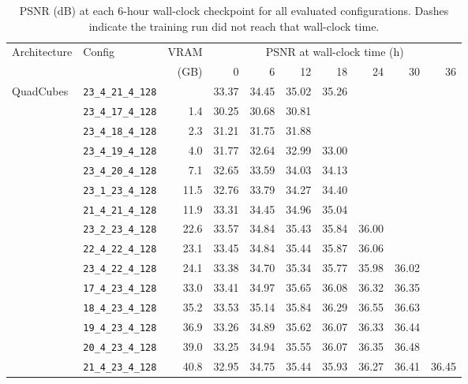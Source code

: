 \documentclass[12pt, a4paper, twoside]{report}
\begin{document}
\begin{table}[htbp]
\caption{PSNR (dB) at each 6-hour wall-clock checkpoint for all evaluated configurations. Dashes indicate the training run did not reach that wall-clock time.}
\label{tab:app_time}
\begin{adjustwidth}{-3cm}{-1cm}
\centering
\footnotesize
\setlength{\tabcolsep}{4pt}
\begin{tabular}{llrrrrrrrr}
\toprule
Architecture & Config & VRAM & \multicolumn{7}{c}{PSNR at wall-clock time (h)} \\
\cmidrule(lr){4-10}
 & & (GB) & 0 & 6 & 12 & 18 & 24 & 30 & 36 \\
\midrule
  QuadCubes & \texttt{23\_4\_21\_4\_128} &   & 33.37 & 34.45 & 35.02 & 35.26 &   &   &   \\
   & \texttt{23\_4\_17\_4\_128} & 1.4 & 30.25 & 30.68 & 30.81 &   &   &   &   \\
   & \texttt{23\_4\_18\_4\_128} & 2.3 & 31.21 & 31.75 & 31.88 &   &   &   &   \\
   & \texttt{23\_4\_19\_4\_128} & 4.0 & 31.77 & 32.64 & 32.99 & 33.00 &   &   &   \\
   & \texttt{23\_4\_20\_4\_128} & 7.1 & 32.65 & 33.59 & 34.03 & 34.13 &   &   &   \\
   & \texttt{23\_1\_23\_4\_128} & 11.5 & 32.76 & 33.79 & 34.27 & 34.40 &   &   &   \\
   & \texttt{21\_4\_21\_4\_128} & 11.9 & 33.31 & 34.45 & 34.96 & 35.04 &   &   &   \\
   & \texttt{23\_2\_23\_4\_128} & 22.6 & 33.57 & 34.84 & 35.43 & 35.84 & 36.00 &   &   \\
   & \texttt{22\_4\_22\_4\_128} & 23.1 & 33.45 & 34.84 & 35.44 & 35.87 & 36.06 &   &   \\
   & \texttt{23\_4\_22\_4\_128} & 24.1 & 33.38 & 34.70 & 35.34 & 35.77 & 35.98 & 36.02 &   \\
   & \texttt{17\_4\_23\_4\_128} & 33.0 & 33.41 & 34.97 & 35.65 & 36.08 & 36.32 & 36.35 &   \\
   & \texttt{18\_4\_23\_4\_128} & 35.2 & 33.53 & 35.14 & 35.84 & 36.29 & 36.55 & 36.63 &   \\
   & \texttt{19\_4\_23\_4\_128} & 36.9 & 33.26 & 34.89 & 35.62 & 36.07 & 36.33 & 36.44 &   \\
   & \texttt{20\_4\_23\_4\_128} & 39.0 & 33.25 & 34.94 & 35.55 & 36.07 & 36.35 & 36.48 &   \\
   & \texttt{21\_4\_23\_4\_128} & 40.8 & 32.95 & 34.75 & 35.44 & 35.93 & 36.27 & 36.41 & 36.45 \\

\end{tabular}
\end{adjustwidth}
\end{table}
\end{document}
